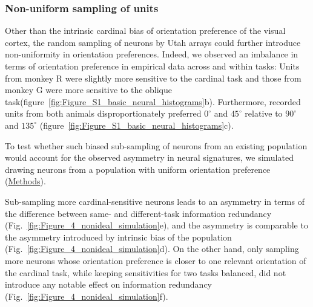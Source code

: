 \documentclass[lineno,pdflatex,sn-basic]{sn-jnl}%
\newcommand{\Ir}{I_{\rm real}} %
\newcommand{\Ideltawithin}{I_{\rm redundancy,within}}
\newcommand{\Icross}{I_{\rm cross}}
\newcommand{\Ideltacross}{I_{\rm redundancy,cross}}
\theoremstyle{thmstyleone}%
\theoremstyle{thmstyletwo}%
\theoremstyle{thmstylethree}%
\begin{document}

\subsubsection{Non-uniform sampling of units}
Other than the intrinsic cardinal bias of orientation preference of the visual cortex, the random sampling of neurons by Utah arrays could further introduce non-uniformity in orientation preferences. Indeed, we observed an imbalance in terms of orientation preference in empirical data across and within tasks: Units from monkey R were slightly more sensitive to the cardinal task and those from monkey G were more sensitive to the oblique task(figure~\ref{fig:Figure_S1_basic_neural_histograms}b). Furthermore, recorded units from both animals disproportionately preferred $0^\circ$ and $45^\circ$ relative to $90^\circ$ and $135^\circ$ (figure~\ref{fig:Figure_S1_basic_neural_histograms}c). 

To test whether such biased sub-sampling of neurons from an existing population would account for the observed asymmetry in neural signatures, we simulated drawing neurons from a population with uniform orientation preference (\hyperref[sec_ch2:simulate_subsampling]{Methods}). 

Sub-sampling more cardinal-sensitive neurons leads to an asymmetry in terms of the difference between same- and different-task information redundancy (Fig.~\ref{fig:Figure_4_nonideal_simulation}e), and the asymmetry is comparable to the asymmetry introduced by intrinsic bias of the population (Fig.~\ref{fig:Figure_4_nonideal_simulation}d).  On the other hand, only sampling more neurons whose orientation preference is closer to one relevant orientation of the cardinal task, while keeping sensitivities for two tasks balanced, did not introduce any notable effect on information redundancy (Fig.~\ref{fig:Figure_4_nonideal_simulation}f).
\end{document}
